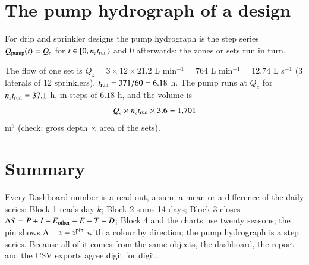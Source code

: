 \section{The pump hydrograph of a design}
For drip and sprinkler designs the pump hydrograph is the step series $Q_{\rm pump}(t)=Q_z$ for $t\in[0,n_zt_{\rm run})$ and 0 afterwards: the zones or sets run in turn.

\sol {}\ans The flow of one set is $Q_z=3\times12\times21.2$ L min$^{-1}=764$ L min$^{-1}=12.74$ L s$^{-1}$ (3 laterals of 12 sprinklers). $t_{\rm run}=371/60=6.18$ h. The pump runs at $Q_z$ for $n_zt_{\rm run}=37.1$ h, in steps of $6.18$ h, and the volume is \[Q_z\times n_zt_{\rm run}\times3.6=1{,}701\] m$^3$ (check: gross depth $\times$ area of the sets). \finans


\section{Summary}
Every Dashboard number is a read-out, a sum, a mean or a difference of the daily series: Block 1 reads day $k$; Block 2 sums 14 days; Block 3 closes $\Delta S=P+I-E_{\rm other}-E-T-D$; Block 4 and the charts use twenty seasons; the pin shows $\Delta=x-x^{\rm pin}$ with a colour by direction; the pump hydrograph is a step series. Because all of it comes from the same objects, the dashboard, the report and the CSV exports agree digit for digit.
